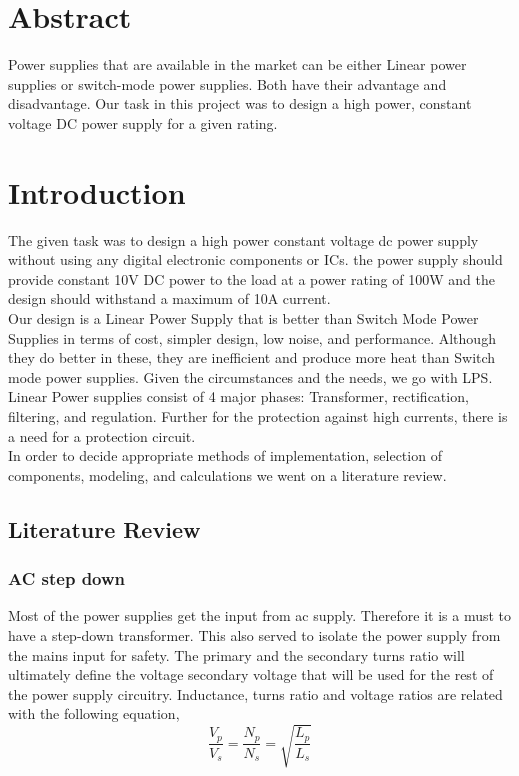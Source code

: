 \documentclass[11pt]{article}
\begin{document}
\tableofcontents
\newpage


\begin{multicols}{2}
\section*{Abstract}
Power supplies that are available in the market can be either Linear power supplies or switch-mode power supplies. Both have their advantage and disadvantage. Our task in this project was to design a high power, constant voltage DC power supply for a given rating. \\
\section{Introduction}
The given task was to design a high power constant voltage dc power supply without using any digital electronic components or ICs. the power supply should provide constant 10V DC power to the load at a power rating of 100W and the design should withstand a maximum of 10A current.\\
Our design is a Linear Power Supply that is better than Switch Mode Power Supplies in terms of cost, simpler design, low noise, and performance. Although they do better in these, they are inefficient and produce more heat than Switch mode power supplies. Given the circumstances and the needs, we go with LPS.\\
Linear Power supplies consist of 4 major phases: Transformer,  rectification, filtering, and regulation. Further for the protection against high currents, there is a need for a protection circuit. \\
In order to decide appropriate methods of implementation, selection of components, modeling, and calculations we went on a literature review.
\subsection{Literature Review}
\subsubsection{AC step down}
Most of the power supplies get the input from ac supply. Therefore it is a must to have a step-down transformer. This also served to isolate the power supply from the mains input for safety. The primary and the secondary turns ratio will ultimately define the voltage secondary voltage that will be used for the rest of the power supply circuitry. Inductance, turns ratio and voltage ratios are related with the following equation,\\
$$\frac{V_p}{V_s} = \frac{N_p}{N_s} = \sqrt{\frac{L_p}{L_s}}$$

\end{multicols}
\end{document}

